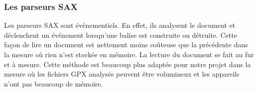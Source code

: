\subsubsection{Les parseurs SAX}
Les parseurs SAX sont événementiels. En effet, ils analysent le document et déclenchent un événement lorsqu'une balise est construite ou détruite. Cette façon de lire un document est nettement moins coûteuse que la précédente dans la mesure où rien n'est stockée en mémoire. La lecture du document se fait au fur et à mesure. Cette méthode est beaucoup plus adaptée pour notre projet dans la mesure où les fichiers GPX analysés peuvent être volumineux et les appareils n'ont pas beaucoup de mémoire. 
